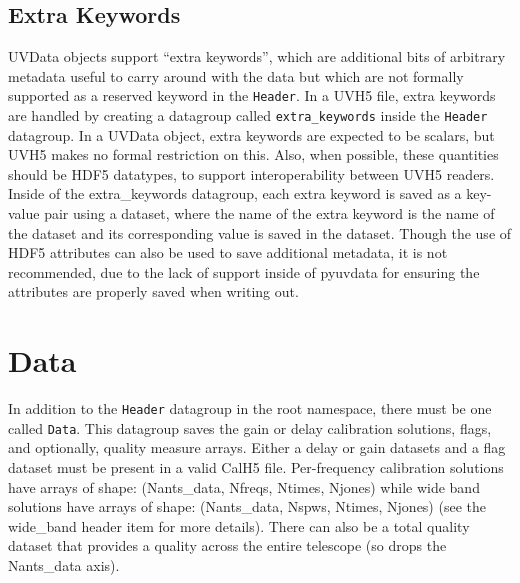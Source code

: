 \documentclass[11pt, oneside]{article}
\begin{document}
\subsection{Extra Keywords}
\label{sec:extra_keywords}
UVData objects support ``extra keywords'', which are additional bits of
arbitrary metadata useful to carry around with the data but which are not
formally supported as a reserved keyword in the \texttt{Header}. In a UVH5 file,
extra keywords are handled by creating a datagroup called \verb+extra_keywords+
inside the \texttt{Header} datagroup. In a UVData object, extra keywords are
expected to be scalars, but UVH5 makes no formal restriction on this. Also, when
possible, these quantities should be HDF5 datatypes, to support interoperability
between UVH5 readers. Inside of the extra\_keywords datagroup, each extra
keyword is saved as a key-value pair using a dataset, where the name of the
extra keyword is the name of the dataset and its corresponding value is saved in
the dataset. Though the use of HDF5 attributes can also be used to save
additional metadata, it is not recommended, due to the lack of support inside of
pyuvdata for ensuring the attributes are properly saved when writing out.



\section{Data}
\label{sec:data}
In addition to the \texttt{Header} datagroup in the root namespace, there must be
one called \texttt{Data}. This datagroup saves the gain or delay calibration solutions,
flags, and optionally, quality measure arrays. Either a delay or gain datasets and
a flag dataset must be present in a valid CalH5 file. Per-frequency calibration
solutions have arrays of shape: (Nants\_data, Nfreqs, Ntimes, Njones) while
wide band solutions have arrays of shape: (Nants\_data, Nspws, Ntimes, Njones)
(see the wide\_band header item for more details). 
There can also be a total quality dataset that provides a quality across the
entire telescope (so drops the Nants\_data axis).
\end{document}
